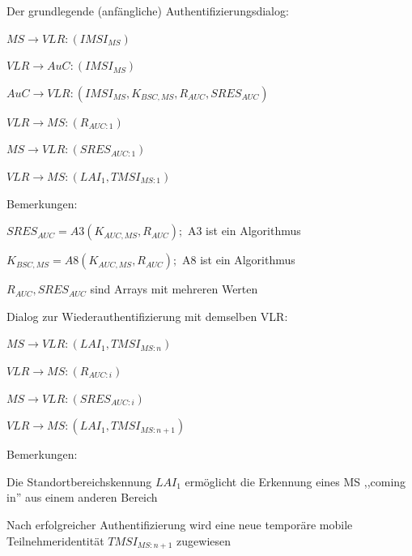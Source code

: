 \documentclass[a4paper]{article}
\begin{document}
\begin{multicols}{3}
      Der grundlegende (anfängliche) Authentifizierungsdialog:
      \begin{enumerate*}
            \item $MS \rightarrow VLR: (IMSI_{MS})$
            \item $VLR \rightarrow AuC: (IMSI_{MS})$
            \item $AuC \rightarrow VLR: (IMSI_{MS}, K_{BSC,MS},
                  R_{AUC}, SRES_{AUC})$
            \item $VLR \rightarrow MS: (R_{AUC:1})$
            \item $MS \rightarrow VLR: (SRES_{AUC:1})$
            \item $VLR \rightarrow MS: (LAI_1 , TMSI_{MS:1})$
      \end{enumerate*}

      \begin{itemize*}
            \item Bemerkungen:
            \begin{itemize*}
                  \item $SRES_{AUC} = A3(K_{AUC,MS}, R_{AUC});$ A3 ist ein Algorithmus
                  \item $K_{BSC,MS} = A8(K_{AUC,MS}, R_{AUC});$ A8 ist ein Algorithmus
                  \item $R_{AUC}, SRES_{AUC}$ sind Arrays mit mehreren Werten
            \end{itemize*}
            \item Dialog zur Wiederauthentifizierung mit demselben VLR:
            \begin{enumerate*}
                  \item $MS \rightarrow VLR: (LAI_1 , TMSI_{MS:n})$
                  \item $VLR \rightarrow MS: (R_{AUC:i})$
                  \item $MS \rightarrow VLR: (SRES_{AUC:i})$
                  \item $VLR \rightarrow MS: (LAI_1, TMSI_{MS:n+1})$
            \end{enumerate*}
            \item Bemerkungen:
            \begin{itemize*}
                  \item Die Standortbereichskennung $LAI_1$ ermöglicht die Erkennung eines MS ,,coming in'' aus einem anderen Bereich
                  \item Nach erfolgreicher Authentifizierung wird eine neue temporäre mobile Teilnehmeridentität $TMSI_{MS:n+1}$ zugewiesen

\end{itemize*}
\end{itemize*}
\end{multicols}
\end{document}
